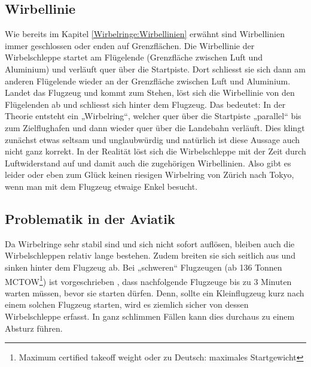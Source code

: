 \subsection{Wirbellinie}
Wie bereits im Kapitel \ref{Wirbelringe:Wirbellinien} erwähnt sind Wirbellinien immer geschlossen oder enden auf Grenzflächen.
Die Wirbellinie der Wirbelschleppe startet am Flügelende (Grenzfläche zwischen Luft und Aluminium) und verläuft quer über die Startpiste.
Dort schliesst sie sich dann am anderen Flügelende wieder an der Grenzfläche zwischen Luft und Aluminium.
Landet das Flugzeug und kommt zum Stehen, löst sich die Wirbellinie von den Flügelenden ab und schliesst sich hinter dem Flugzeug.
Das bedeutet: In der Theorie entsteht ein „Wirbelring“, welcher quer über die Startpiste „parallel“ bis zum Zielflughafen und dann wieder quer über die Landebahn verläuft.
Dies klingt zunächst etwas seltsam und unglaubwürdig und natürlich ist diese Aussage auch nicht ganz korrekt.
In der Realität löst sich die Wirbelschleppe mit der Zeit durch Luftwiderstand auf und damit auch die zugehörigen Wirbellinien.
Also gibt es leider oder eben zum Glück keinen riesigen Wirbelring von Zürich nach Tokyo, wenn man mit dem Flugzeug etwaige Enkel besucht.



\subsection{Problematik in der Aviatik}
Da Wirbelringe sehr stabil sind und sich nicht sofort auflösen, bleiben auch die Wirbelschleppen relativ lange bestehen.
Zudem breiten sie sich seitlich aus und sinken hinter dem Flugzeug ab.
Bei „schweren“ Flugzeugen (ab 136 Tonnen MCTOW\footnote{Maximum certified takeoff weight oder zu Deutsch: maximales Startgewicht}) ist vorgeschrieben \cite{Wirbelringe:WakeTurbulence}, dass nachfolgende Flugzeuge bis zu 3 Minuten warten müssen, bevor sie starten dürfen.
Denn, sollte ein Kleinflugzeug kurz nach einem solchen Flugzeug starten, wird es ziemlich sicher von dessen Wirbelschleppe erfasst.
In ganz schlimmen Fällen kann dies durchaus zu einem Absturz führen.

